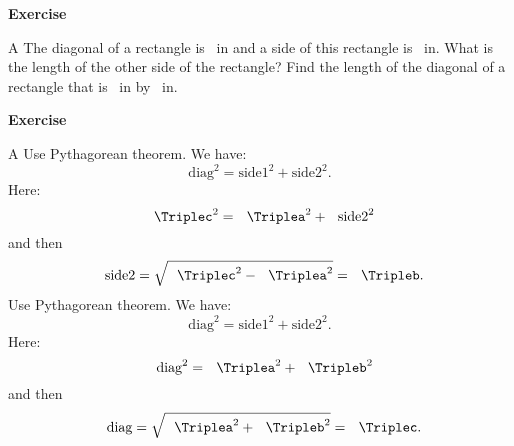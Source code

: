 \documentclass{article}
\begin{document}
{%
  \begin{center}
  \end{center}
  \textbf{Exercise} \par
  \if A\Note
    The diagonal of a rectangle is \Triplec~in and a side of this
    rectangle is \Triplea~in. What is the length of the other side of
    the rectangle?
  \else
    Find the length of the diagonal of a rectangle that is \Triplea~in
    by \Tripleb~in.
  \fi
  \newpage
  \begin{center}
  \end{center}
  \textbf{Exercise} \par
  \if A\Note
    Use Pythagorean theorem. We have:
    \[\text{diag}^2=\text{side1}^2+\text{side2}^2.\]
    Here:
    \[\Triplec^2=\Triplea^2+\text{side2}^2\]
    and then
    \[\text{side2}=\sqrt{\Triplec^2-\Triplea^2} = \Tripleb.\]
  \else
    Use Pythagorean theorem. We have:
    \[\text{diag}^2=\text{side1}^2+\text{side2}^2.\]
    Here:
    \[\text{diag}^2=\Triplea^2+\Tripleb^2\]
    and then
    \[\text{diag}=\sqrt{\Triplea^2+\Tripleb^2} = \Triplec.\]
  \fi
  \newpage
}
\end{document}
